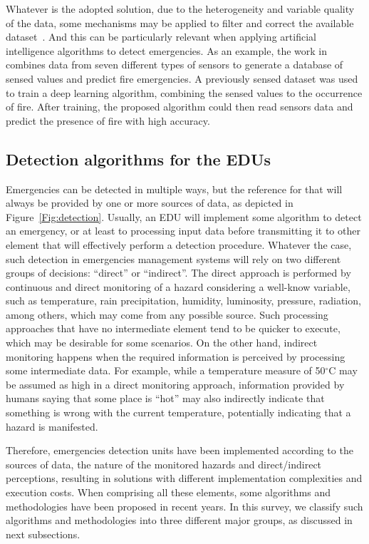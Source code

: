 \begin{refsection}
Whatever is the adopted solution, due to the heterogeneity and variable quality of the data, some mechanisms may be applied to filter and correct the available dataset~\cite{bigdata1}. And this can be particularly relevant when applying artificial intelligence algorithms to detect emergencies. As an example, the work in~\cite{fireBigdata1} combines data from seven different types of sensors to generate a database of sensed values and predict fire emergencies. A previously sensed dataset was used to train a deep learning algorithm, combining the sensed values to the occurrence of fire. After training, the proposed algorithm could then read sensors data and predict the presence of fire with high accuracy. 

\subsection{Detection algorithms for the EDUs}

Emergencies can be detected in multiple ways, but the reference for that will always be provided by one or more sources of data, as depicted in Figure~\ref{Fig:detection}. Usually, an EDU will implement some algorithm to detect an emergency, or at least to processing input data before transmitting it to other element that will effectively perform a detection procedure. Whatever the case, such detection in emergencies management systems will rely on two different groups of decisions:  ``direct'' or ``indirect''. The direct approach is performed by continuous and direct monitoring of a hazard considering a well-know variable, such as temperature, rain precipitation, humidity, luminosity, pressure, radiation, among others, which may come from any possible source. Such processing approaches that have no intermediate element tend to be quicker to execute, which may be desirable for some scenarios. On the other hand, indirect monitoring happens when the required information is perceived by processing some intermediate data. For example, while a temperature measure of 50$^{\circ}$C may be assumed as high in a direct monitoring approach, information provided by humans saying that some place is ``hot'' may also indirectly indicate that something is wrong with the current temperature, potentially indicating that a hazard is manifested. 

Therefore, emergencies detection units have been implemented according to the sources of data, the nature of the monitored hazards and direct/indirect perceptions, resulting in solutions with different implementation complexities and execution costs. When comprising all these elements, some algorithms and methodologies have been proposed in recent years. In this survey, we classify such algorithms and methodologies into three different major groups, as discussed in next subsections.


\end{refsection}
